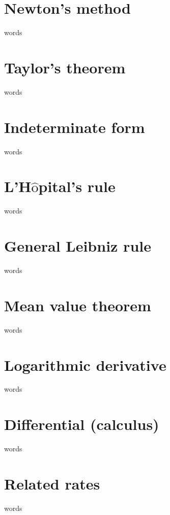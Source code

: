 \section{Newton's method}
words

\section{Taylor's theorem}
words

\section{Indeterminate form}
words

\section{L'H$\hat{\textrm{o}}$pital's rule}
words

\section{General Leibniz rule}
words

\section{Mean value theorem}
words

\section{Logarithmic derivative}
words

\section{Differential (calculus)}
words

\section{Related rates}
words



